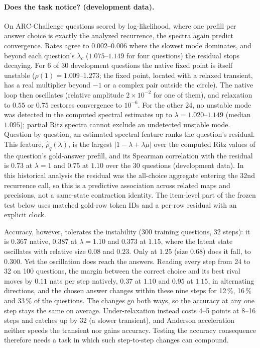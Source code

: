\documentclass[11pt,letterpaper]{article}
\begin{document}
\paragraph{Does the task notice? (development data).} On ARC-Challenge \cite{clark2018arc} questions scored by
log-likelihood, where one prefill per answer choice is exactly the analyzed recurrence, the spectra again predict
convergence. Rates agree to $0.002$--$0.006$ where the slowest mode dominates, and beyond each question's $\lambda_c$
($1.075$--$1.149$ for four questions) the residual stops decaying. For 6 of 30 development questions the native fixed
point is itself unstable ($\rho(1)=1.009$--$1.273$; the fixed point, located with a relaxed transient, has a real
multiplier beyond $-1$ or a complex pair outside the circle). The native loop then oscillates (relative amplitude
$2\times10^{-2}$ for one of them), and relaxation to $0.55$ or $0.75$ restores convergence to $10^{-6}$. For the
other 24, no unstable mode was detected in the computed spectral estimates up to $\lambda=1.020$--$1.149$ (median
$1.095$); partial Ritz spectra cannot exclude an undetected unstable mode. Question by question, an
estimated spectral feature ranks the question's residual. This feature, $\hat\rho_q(\lambda)$, is the largest
$|1-\lambda+\lambda\mu|$ over the computed Ritz values of the question's gold-answer prefill, and its Spearman
correlation with the residual is $0.73$ at $\lambda=1$ and $0.75$ at $1.10$ over the 30 questions (development
data). In this historical analysis the residual was the all-choice aggregate entering the 32nd recurrence call, so
this is a predictive association across related maps and precisions, not a same-state contraction identity. The item-level part of the frozen test below uses matched gold-row token IDs and
a per-row residual with an explicit clock.

Accuracy, however, tolerates the instability (300 training questions, 32 steps): it is $0.367$ native, $0.387$ at
$\lambda=1.10$ and $0.373$ at $1.15$, where the latent state oscillates with relative size $0.08$ and $0.23$. Only at
$1.25$ (size $0.68$) does it fall, to $0.300$. Yet the oscillation does reach the answers. Reading every step from 24
to 32 on 100 questions, the margin between the correct choice and its best rival moves by $0.11$ nats per step
natively, $0.37$ at $1.10$ and $0.95$ at $1.15$, in alternating directions, and the chosen answer changes within these
nine steps for 12\,\%, 16\,\% and 33\,\% of the questions. The changes go both ways, so the accuracy at any one step
stays the same on average. Under-relaxation instead costs 4--5 points at 8--16 steps and catches up by 32 (a slower
transient), and Anderson acceleration neither speeds the transient nor gains accuracy. Testing the accuracy
consequence therefore needs a task in which such step-to-step changes can compound.
\end{document}
